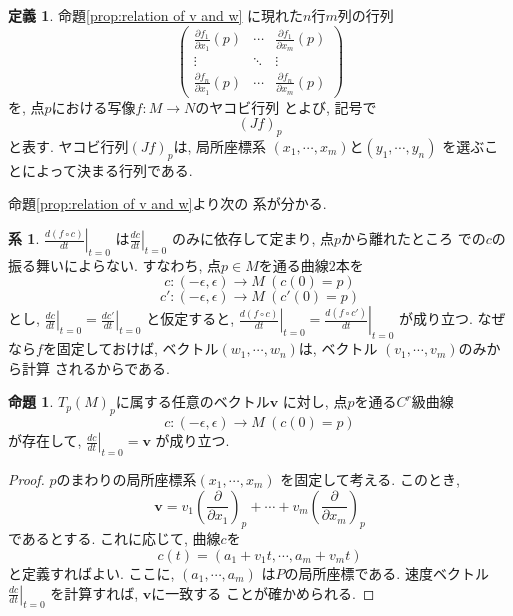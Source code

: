 \documentclass[a4j,12pt]{jarticle}
\theoremstyle{definition}
\newtheorem{definition}[theorem]{定義}
\newtheorem{proposition}[theorem]{命題}
\newtheorem{corollary}[theorem]{系}
\begin{document}
\begin{definition}\label{def:Jacobian matrix}
    命題\ref{prop:relation of v and w}
に現れた$n$行$m$列の行列
$$\left(
    \begin{array}{ccc}
      \frac{\partial f_1}{\partial x_1}(p)&\cdots &\frac{\partial f_1}{\partial x_m}(p)\\
      \vdots &\ddots& \vdots \\
      \frac{\partial f_n}{\partial x_1}(p)&\cdots &\frac{\partial f_n}{\partial x_m}(p) 
    \end{array} 
  \right)$$
を, 点$p$における写像$f:M\to N$のヤコビ行列
とよび, 記号で
$$(Jf)_p$$
と表す. ヤコビ行列$(Jf)_p$は, 局所座標系
$(x_1,\cdots ,x_m)$と$(y_1,\cdots ,y_n)$
を選ぶことによって決まる行列である. 
\end{definition}
命題\ref{prop:relation of v and w}より次の
系が分かる. 
\begin{corollary}\label{coro:any c is OK}
    $\left .\frac{d(f\circ c)}{dt}\right|_{t=0}$
    は$\left .\frac{dc}{dt}\right|_{t=0}$
    のみに依存して定まり, 点$p$から離れたところ
    での$c$の振る舞いによらない. 
    すなわち, 点$p\in M$を通る曲線$2$本を
    $$c:(-\epsilon, \epsilon)\to M\ (c(0)=p)$$
    $$c':(-\epsilon, \epsilon)\to M\ (c'(0)=p)$$
    とし, 
    $\left .\frac{dc}{dt}\right|_{t=0}=
    \left .\frac{dc'}{dt}\right|_{t=0}$
    と仮定すると, 
    $\left .\frac{d(f\circ c)}{dt}\right|_{t=0}=
    \left .\frac{d(f\circ c')}{dt}\right|_{t=0}$
    が成り立つ. なぜなら$f$を固定しておけば, 
    ベクトル$(w_1,\cdots ,w_n)$は, ベクトル
    $(v_1,\cdots ,v_m)$のみから計算
    されるからである. 
\end{corollary}
\begin{proposition}\label{prop:c exist}
    $T_p(M)_p$に属する任意のベクトル$\boldsymbol{v}$
    に対し, 点$p$を通る$C^r$級曲線
    $$c:(-\epsilon, \epsilon)\to M\ (c(0)=p)$$
    が存在して, $\left .\frac{dc}{dt}
    \right|_{t=0}=\boldsymbol{v}$
    が成り立つ. 
\end{proposition}
\begin{proof}
    $p$のまわりの局所座標系$(x_1,\cdots ,x_m)$
    を固定して考える. このとき, 
    $$\boldsymbol{v}=
    v_1\left(\frac{\partial}{\partial x_1}\right)_p
    +\cdots +
    v_m\left(\frac{\partial}{\partial x_m}\right)_p$$
    であるとする. これに応じて, 曲線$c$を
    $$c(t)=(a_1+v_1t,\cdots ,a_m+v_mt)$$
    と定義すればよい. ここに, $(a_1,\cdots ,a_m)$
    は$P$の局所座標である. 速度ベクトル
    $\left .\frac{dc}{dt}\right|_{t=0}$
    を計算すれば, $\boldsymbol{v}$に一致する
    ことが確かめられる. 
\end{proof}
\end{document}
